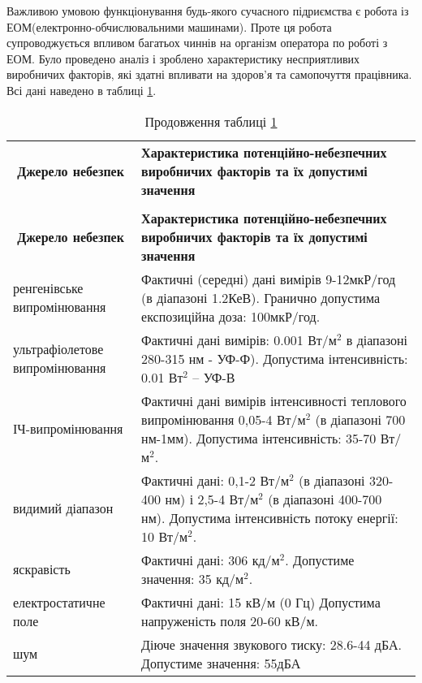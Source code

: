 \par Важливою умовою функціонування будь-якого сучасного підриємства є робота із ЕОМ(електронно-обчислювальними машинами). Проте ця робота супроводжується впливом багатьох чиннів на організм оператора по роботі з ЕОМ. Було проведено аналіз і зроблено характеристику несприятливих виробничих факторів, які здатні впливати на здоров'я та самопочуття працівника. Всі дані наведено в таблиці \ref{t:safety1}.

{\footnotesize
\begin{longtable}{|p{4cm}|p{12cm}|}
\captionsetup{justification=centering}
\caption{Аналіз потенційних небезпек виробничих факторів при роботі з ЕОМ}\label{t:safety1}\\
\hline
\multicolumn{1}{|c|}{\textbf{Джерело небезпек}}&
\multicolumn{1}{p{12cm}|}{\textbf{Характеристика потенційно-небезпечних виробничих факторів та їх допустимі значення}}\\\hline

\endfirsthead
\caption*{\hfill Продовження таблиці \ref{t:safety1}}\\\hline

\multicolumn{1}{|c|}{\textbf{Джерело небезпек}}&
\multicolumn{1}{p{12cm}|}{\textbf{Характеристика потенційно-небезпечних виробничих факторів та їх допустимі значення}}\\\hline
\endhead

ренгенівське випромінювання	& Фактичні (середні) дані вимірів 9-12мкР/год (в діапазоні 1.2КеВ). Гранично допустима експозиційна доза: 100мкР/год.  	\\ \hline


ультрафіолетове випромінювання & Фактичні дані вимірів: 0.001 Вт/м$^2$ в діапазоні 280-315 нм - УФ-Ф). Допустима інтенсивність: 0.01 Вт$^2$ -- УФ-В\\ \hline


ІЧ-випромінювання 	& 	Фактичні дані вимірів інтенсивності теплового випромінювання 0,05-4 Вт/м$^2$ (в діапазоні 700 нм-1мм). Допустима інтенсивність:  35-70 Вт/м$^2$.	\\ \hline

видимий діапазон  	& 	Фактичні дані: 0,1-2 Вт/м$^2$ (в діапазоні 320-400 нм) і 2,5-4 Вт/м$^2$ (в діапазоні 400-700 нм). Допустима інтенсивність потоку енергії:  10 Вт/м$^2$.	\\ \hline


яскравість 	& 	Фактичні дані: 306 кд/м$^2$. Допустиме значення: 35 кд/м$^2$.	\\ \hline

електростатичне поле & Фактичні дані: 15 кВ/м (0 Гц) Допустима напруженість поля  20-60 кВ/м.\\ \hline

шум 	& 	Діюче значення звукового тиску: 28.6-44 дБА. Допустиме значення: 55дБА
	\\ \hline

\end{longtable}
}

